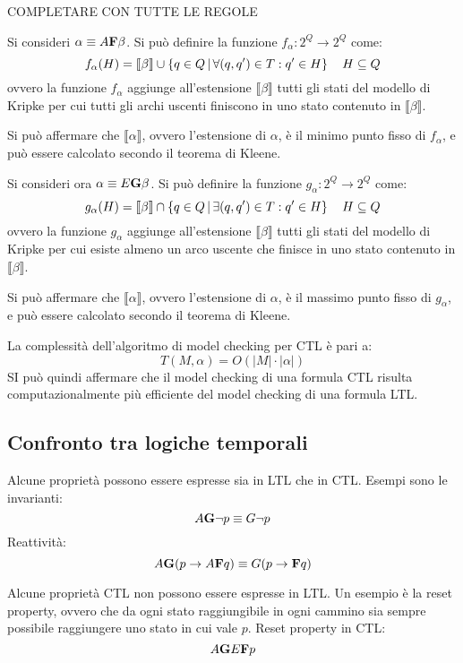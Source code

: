 COMPLETARE CON TUTTE LE REGOLE

Si consideri $\alpha \equiv A \textnormal{\textbf{F}} \beta$.
Si può definire la funzione $f_{\alpha} : 2^Q \longrightarrow 2^Q$ come:
\[
    f_{\alpha}(H) = \llbracket \beta \rrbracket \cup
    \left\{q \in Q \, | \, \forall (q, q') \in T : q' \in H\right\}
    \quad H \subseteq Q
\]
ovvero la funzione $f_{\alpha}$ aggiunge all'estensione $\llbracket \beta \rrbracket$
tutti gli stati del modello di Kripke per cui tutti gli archi uscenti
finiscono in uno stato contenuto in $\llbracket \beta \rrbracket$.

Si può affermare che $\llbracket \alpha \rrbracket$, ovvero l'estensione
di $\alpha$, è il minimo punto fisso di $f_{\alpha}$, e può essere calcolato
secondo il teorema di Kleene.

Si consideri ora $\alpha \equiv E \textnormal{\textbf{G}} \beta$.
Si può definire la funzione $g_{\alpha} : 2^Q \longrightarrow 2^Q$ come:
\[
    g_{\alpha}(H) = \llbracket \beta \rrbracket \cap
    \left\{q \in Q \, | \, \exists(q, q') \in T : q' \in H\right\} \quad
    H \subseteq Q
\]
ovvero la funzione $g_{\alpha}$ aggiunge all'estensione
$\llbracket \beta \rrbracket$ tutti gli stati del modello di Kripke
per cui esiste almeno un arco uscente che finisce in uno stato contenuto
in $\llbracket \beta \rrbracket$.

Si può affermare che $\llbracket \alpha \rrbracket$, ovvero l'estensione
di $\alpha$, è il massimo punto fisso di $g_{\alpha}$, e può essere
calcolato secondo il teorema di Kleene.

La complessità dell'algoritmo di model checking per CTL è pari a:
\[
    T(M, \alpha) = O(|M| \cdot |\alpha|)
\]
SI può quindi affermare che il model checking di una formula CTL
risulta computazionalmente più efficiente del model checking di una formula
LTL.

\subsection{Confronto tra logiche temporali}
Alcune proprietà possono essere espresse sia in LTL che in CTL.
Esempi sono le invarianti:
\[
    A \textnormal{\textbf{G}} \lnot p \equiv G \lnot p
\]
Reattività:
\[
    A \textnormal{\textbf{G}} (p \rightarrow A \textnormal{\textbf{F}}  q) \equiv
    G (p \rightarrow \textnormal{\textbf{F}} q)
\]

Alcune proprietà CTL non possono essere espresse in LTL.
Un esempio è la reset property, ovvero che da ogni stato raggiungibile
in ogni cammino sia sempre possibile raggiungere uno stato in cui vale
$p$. Reset property in CTL:
\[
    A \textnormal{\textbf{G}} E \textnormal{\textbf{F}} p
\]

